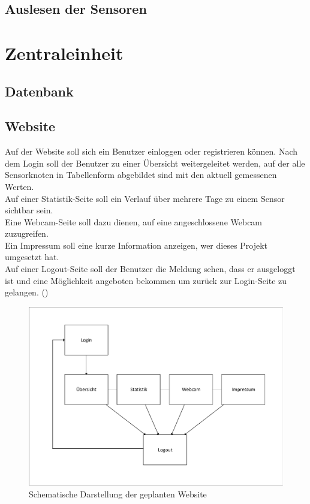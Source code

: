 \subsection{Auslesen der Sensoren}
\section{Zentraleinheit}
\subsection{Datenbank}
\subsection{Website}

Auf der Website soll sich ein Benutzer einloggen oder registrieren können.
Nach dem Login soll der Benutzer zu einer Übersicht weitergeleitet werden, auf der alle Sensorknoten in
Tabellenform abgebildet sind mit den aktuell gemessenen Werten. \\
Auf einer Statistik-Seite soll ein Verlauf über mehrere Tage zu einem Sensor sichtbar sein.\\
Eine Webcam-Seite soll dazu dienen, auf eine angeschlossene Webcam zuzugreifen.\\
Ein Impressum soll eine kurze Information anzeigen, wer dieses Projekt umgesetzt hat.\\
Auf einer Logout-Seite soll der Benutzer die Meldung sehen, dass er ausgeloggt ist und eine Möglichkeit angeboten bekommen um zurück zur Login-Seite zu gelangen.
()

\begin{figure} [htb]
\begin{centering}
\includegraphics[scale=0.8]{Bilder/struktur_website_einfach.pdf}
\caption[Schematische Darstellung der geplanten Website]{Schematische
Darstellung der geplanten Website}
\label{Darstellung_Website_einfach}
\end{centering}
\end{figure}

